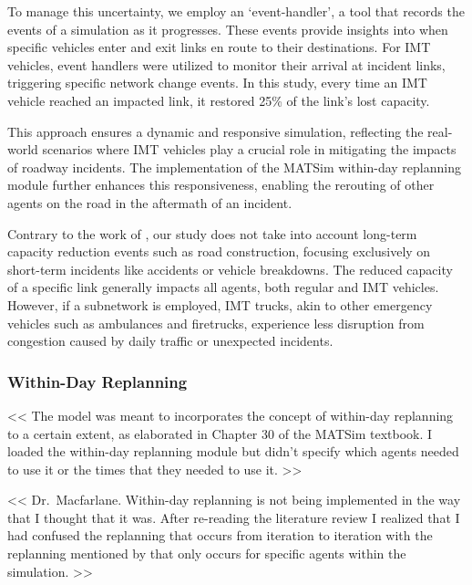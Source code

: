 \documentclass[
  letterpaper,
  authoryear]{elsarticle}
\begin{document}
To manage this uncertainty, we employ an `event-handler', a tool that
records the events of a simulation as it progresses. These events
provide insights into when specific vehicles enter and exit links en
route to their destinations. For IMT vehicles, event handlers were
utilized to monitor their arrival at incident links, triggering specific
network change events. In this study, every time an IMT vehicle reached
an impacted link, it restored 25\% of the link's lost capacity.

This approach ensures a dynamic and responsive simulation, reflecting
the real-world scenarios where IMT vehicles play a crucial role in
mitigating the impacts of roadway incidents. The implementation of the
MATSim within-day replanning module further enhances this
responsiveness, enabling the rerouting of other agents on the road in
the aftermath of an incident.

Contrary to the work of \citet{kaddoura2018}, our study does not take
into account long-term capacity reduction events such as road
construction, focusing exclusively on short-term incidents like
accidents or vehicle breakdowns. The reduced capacity of a specific link
generally impacts all agents, both regular and IMT vehicles. However, if
a subnetwork is employed, IMT trucks, akin to other emergency vehicles
such as ambulances and firetrucks, experience less disruption from
congestion caused by daily traffic or unexpected incidents.

\hypertarget{within-day-replanning}{%
\subsubsection{Within-Day Replanning}\label{within-day-replanning}}

\textless\textless{} The model was meant to incorporates the concept of
within-day replanning to a certain extent, as elaborated in Chapter 30
of the MATSim textbook. I loaded the within-day replanning module but
didn't specify which agents needed to use it or the times that they
needed to use it. \textgreater\textgreater{}

\textless\textless{} Dr.~Macfarlane. Within-day replanning is not being
implemented in the way that I thought that it was. After re-reading the
literature review I realized that I had confused the replanning that
occurs from iteration to iteration with the replanning mentioned by
\citet{kaddoura2018} that only occurs for specific agents within the
simulation. \textgreater\textgreater{}
\end{document}
